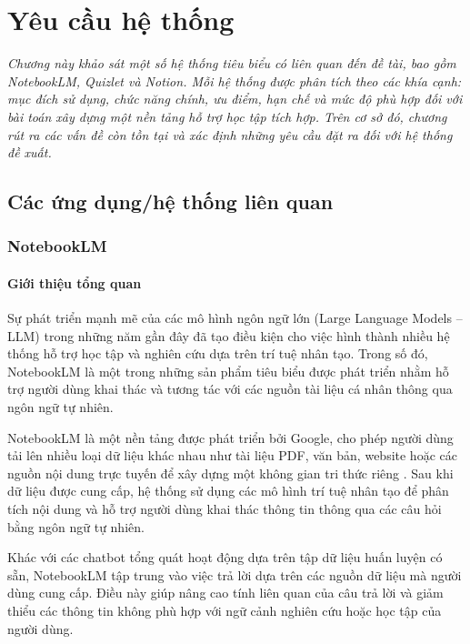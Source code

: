 \chapter{Yêu cầu hệ thống}
\label{Chapter2}

\textit{Chương này khảo sát một số hệ thống tiêu biểu có liên quan đến đề tài, bao gồm NotebookLM, Quizlet và Notion. Mỗi hệ thống được phân tích theo các khía cạnh: mục đích sử dụng, chức năng chính, ưu điểm, hạn chế và mức độ phù hợp đối với bài toán xây dựng một nền tảng hỗ trợ học tập tích hợp. Trên cơ sở đó, chương rút ra các vấn đề còn tồn tại và xác định những yêu cầu đặt ra đối với hệ thống đề xuất.}

\section{Các ứng dụng/hệ thống liên quan}
\subsection{NotebookLM}
\subsubsection{Giới thiệu tổng quan}

Sự phát triển mạnh mẽ của các mô hình ngôn ngữ lớn (Large Language Models – LLM) trong những năm gần đây đã tạo điều kiện cho việc hình thành nhiều hệ thống hỗ trợ học tập và nghiên cứu dựa trên trí tuệ nhân tạo. Trong số đó, NotebookLM là một trong những sản phẩm tiêu biểu được phát triển nhằm hỗ trợ người dùng khai thác và tương tác với các nguồn tài liệu cá nhân thông qua ngôn ngữ tự nhiên.

NotebookLM là một nền tảng được phát triển bởi Google, cho phép người dùng tải lên nhiều loại dữ liệu khác nhau như tài liệu PDF, văn bản, website hoặc các nguồn nội dung trực tuyến để xây dựng một không gian tri thức riêng \cite{googleNotebookLMHelp,googleNotebookLMSources}. Sau khi dữ liệu được cung cấp, hệ thống sử dụng các mô hình trí tuệ nhân tạo để phân tích nội dung và hỗ trợ người dùng khai thác thông tin thông qua các câu hỏi bằng ngôn ngữ tự nhiên.

Khác với các chatbot tổng quát hoạt động dựa trên tập dữ liệu huấn luyện có sẵn, NotebookLM tập trung vào việc trả lời dựa trên các nguồn dữ liệu mà người dùng cung cấp. Điều này giúp nâng cao tính liên quan của câu trả lời và giảm thiểu các thông tin không phù hợp với ngữ cảnh nghiên cứu hoặc học tập của người dùng.

